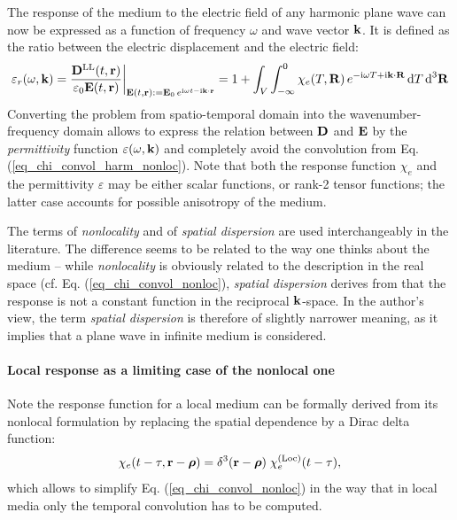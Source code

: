 The response of the medium to the electric field of any harmonic plane wave can now be expressed as a function of frequency $\omega$ and wave vector ${\mathbf{k}}$. It is defined as the ratio between the electric displacement and the electric field:
\begin{equation} \varepsilon_r(\omega, {\mathbf{k}}) = \frac{{\mathbf{D}^\text{LL}}(t,{\mathbf{r}})}{\varepsilon_0 \mathbf{E}(t,{\mathbf{r}})} \biggr|_{\mathbf{E}(t, {\mathbf{r}}) := \mathbf{E}_0 \, e^{{\mathrm i}\omega t - {\mathrm i}{\mathbf{k}}\cdot{\mathbf{r}}}} = 1 + \int_{V} \int_{-\infty}^{0} \chi_e(T, \mathbf{R}) \,e^{-{\mathrm i}\omega T + {\mathrm i}{\mathbf{k}}\cdot \mathbf{R}} \,\mbox{d}T \,\mbox{d}^3\mathbf{R} \label{eq_eps_nonloc}\end{equation}
Converting the problem from spatio-temporal domain into the wavenumber-frequency domain allows to express the relation between $\mathbf{D}$ and $\mathbf{E}$ by the \textit{permittivity} function $\varepsilon(\omega, {\mathbf{k}})$ and completely avoid the convolution from Eq. (\ref{eq_chi_convol_harm_nonloc}). Note that both the response function $\chi_e$ and the permittivity $\varepsilon$ %
may be either scalar functions, or rank-2 tensor functions; the latter case accounts for possible anisotropy of the medium.

The terms of \textit{nonlocality} and of \textit{spatial dispersion} are used interchangeably in the literature. The difference seems to be related to the way one thinks about the medium -- while \textit{nonlocality} is obviously related to the description in the real space (cf. Eq. (\ref{eq_chi_convol_nonloc}), \textit{spatial dispersion} derives from that the response is not a constant function in the reciprocal ${\mathbf{k}}$-space. In the author's view, the term \textit{spatial dispersion} is therefore of slightly narrower meaning, as it implies that a plane wave in infinite medium is considered.
\paragraph{Local response as a limiting case of the nonlocal one} %
Note the response function for a local medium can be formally derived from its nonlocal formulation by replacing the spatial dependence by a Dirac delta function: %
\begin{equation} \chi_e(t-\tau, {\mathbf{r}}-\boldsymbol{\rho}) = \delta^{3}({\mathbf{r}}-\boldsymbol{\rho}) \; \chi_e^{\rm(Loc)}(t-\tau), \label{eq_loc_chi}\end{equation}
which allows to simplify Eq. (\ref{eq_chi_convol_nonloc}) in the way that in local media only the temporal convolution has to be computed.


